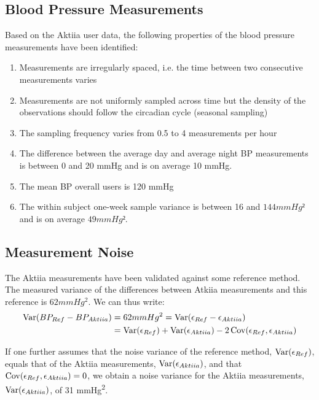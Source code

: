 \subsection{Blood Pressure Measurements}\label{subsec:blood-pressure-measurements}
Based on the Aktiia user data, the following properties of
the blood pressure measurements have been identified:
\begin{enumerate}
    \item Measurements are irregularly spaced, i.e. the time between two consecutive measurements varies
    \item Measurements are not uniformly sampled across time but the density of the observations should
    follow the circadian cycle (seasonal sampling)
    \item The sampling frequency varies from 0.5 to 4 measurements per hour
    \item The difference between the average day and average night BP measurements is between
    0 and 20 mmHg and is on average 10 mmHg.
    \item The mean BP overall users is 120 mmHg
    \item The within subject one-week sample variance is between 16 and $144 mmHg²$ and is on average $49 mmHg²$.
\end{enumerate}


\subsection{Measurement Noise}

The Aktiia measurements have been validated against some
reference method.
The measured variance of the differences between Atkiia measurements
and this reference is $62 mmHg^2$.
We can thus write:
\begin{align*}
    \operatorname{Var}(BP_{Ref} - BP_{Aktiia})
    & = 62 mmHg^2 = \operatorname{Var}(\epsilon_{Ref} - \epsilon_{Aktiia}) \\
    & = \operatorname{Var}(\epsilon_{Ref}) + \operatorname{Var}(\epsilon_{Aktiia}) - 2\operatorname{Cov}(\epsilon_{Ref},
    \epsilon_{Aktiia})
\end{align*}

If one further assumes that the noise variance of the reference method,
$\operatorname{Var}(\epsilon_{Ref})$, equals that of the Aktiia measurements, $\operatorname{Var}(\epsilon_{Aktiia})$,
and that $\operatorname{Cov}(\epsilon_{Ref}, \epsilon_{Aktiia})=0$, we obtain a noise variance
for the Aktiia measurements,
$\operatorname{Var}(\epsilon_{Aktiia})$, of 31 mmHg\textsuperscript{2}.



